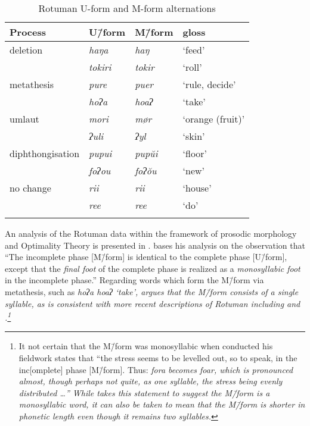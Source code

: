 \begin{table}[h]
	\caption{Rotuman U-form and M-form alternations}\label{tab:RotPhaAlt}
	\centering
		\begin{tabular}{llll}\lsptoprule
				Process 			& U\=/form	 		& M\=/form			& gloss \\ \midrule
				deletion			&	\it{haŋa}		& \it{haŋ}		& `feed'	\\
											&	\it{tokiri}	& \it{tokir}	& `roll'	\\
				metathesis		&	\it{pure}		& \it{puer} 	& `rule, decide'	\\
											&	\it{hoʔa}		& \it{hoaʔ} 	& `take'	\\
				umlaut				&	\it{mori}		& \it{mør} 		& `orange (fruit)'	\\
											&	\it{ʔuli}		& \it{ʔyl} 		& `skin'	\\
		diphthongisation	&	\it{pupui}	& \it{pupŭi}	& `floor'	\\
											&	\it{foʔou}	& \it{foʔŏu}	& `new'	\\
					no change		&	\it{rii}		& \it{rii} 		& `house'	\\
											&	\it{ree}		& \it{ree}		& `do'	\\
											\lspbottomrule
		\end{tabular}
\end{table}

An analysis of the Rotuman data within the framework of
prosodic morphology and Optimality Theory \citep{prsm93}
is presented in \cite{mcc00}.
\citet[159]{mcc00} bases his analysis on the observation that
{``The incomplete phase [M\=/form] is identical to the complete phase [U\=/form],
except that the \emph{final foot} of the complete phase is realized as a
\emph{monosyllabic foot} in the incomplete phase.''}
Regarding words which form the M\=/form
via metathesis, such as \it{hoʔa} {\ra} \it{hoaʔ} `take',
\cite{mcc00} argues that the M\=/form consists of a single syllable,
as is consistent with more recent descriptions of Rotuman including \cite{be87} and \cite{va02}.\footnote{\label{fn:Problem1}
		It not certain that the M\=/form was
		monosyllabic when \citeauthor{ch40} conducted his fieldwork
		\citet[86]{ch40} states that
		``the stress seems to be levelled out, so to speak,
		in the inc[omplete] phase [M\=/form]. Thus: \it{fo}ra becomes \it{foar},
		which is pronounced almost, though perhaps not quite, as one syllable,
		the stress being evenly distributed {\ldots}''
		While \cite{mcc00} takes this statement to suggest the M\=/form
		is a monosyllabic word, it can also be taken
		to mean that the M\=/form is shorter in phonetic length
		even though it remains two syllables.}

